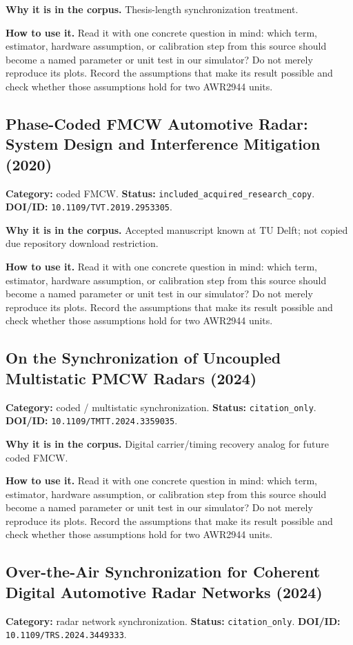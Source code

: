 \documentclass[11pt]{article}
\begin{document}
\textbf{Why it is in the corpus.} Thesis-length synchronization treatment.

\textbf{How to use it.} Read it with one concrete question in mind: which term, estimator, hardware assumption, or calibration step from this source should become a named parameter or unit test in our simulator? Do not merely reproduce its plots. Record the assumptions that make its result possible and check whether those assumptions hold for two AWR2944 units.

\subsection*{Phase-Coded FMCW Automotive Radar: System Design and Interference Mitigation (2020)}
\textbf{Category:} coded FMCW. \textbf{Status:} \nolinkurl{included_acquired_research_copy}. \textbf{DOI/ID:} \nolinkurl{10.1109/TVT.2019.2953305}.

\textbf{Why it is in the corpus.} Accepted manuscript known at TU Delft; not copied due repository download restriction.

\textbf{How to use it.} Read it with one concrete question in mind: which term, estimator, hardware assumption, or calibration step from this source should become a named parameter or unit test in our simulator? Do not merely reproduce its plots. Record the assumptions that make its result possible and check whether those assumptions hold for two AWR2944 units.

\subsection*{On the Synchronization of Uncoupled Multistatic PMCW Radars (2024)}
\textbf{Category:} coded / multistatic synchronization. \textbf{Status:} \nolinkurl{citation_only}. \textbf{DOI/ID:} \nolinkurl{10.1109/TMTT.2024.3359035}.

\textbf{Why it is in the corpus.} Digital carrier/timing recovery analog for future coded FMCW.

\textbf{How to use it.} Read it with one concrete question in mind: which term, estimator, hardware assumption, or calibration step from this source should become a named parameter or unit test in our simulator? Do not merely reproduce its plots. Record the assumptions that make its result possible and check whether those assumptions hold for two AWR2944 units.

\subsection*{Over-the-Air Synchronization for Coherent Digital Automotive Radar Networks (2024)}
\textbf{Category:} radar network synchronization. \textbf{Status:} \nolinkurl{citation_only}. \textbf{DOI/ID:} \nolinkurl{10.1109/TRS.2024.3449333}.
\end{document}
